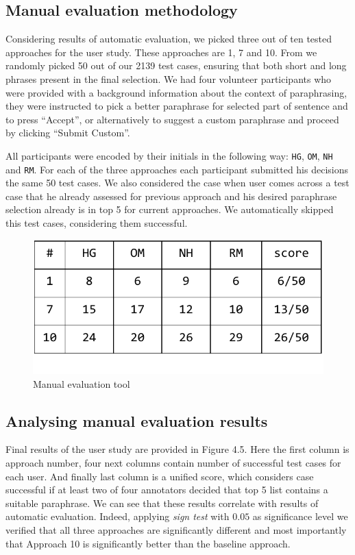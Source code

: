 \subsection{Manual evaluation methodology}

Considering results of automatic evaluation, we picked three out of ten tested approaches for the user study. These approaches are 1, 7 and 10. From we randomly picked 50 out of our 2139 test cases, ensuring that both short and long phrases present in the final selection. We had four volunteer participants who were provided with a background information about the context of paraphrasing, they were instructed to pick a better paraphrase for selected part of sentence and to press ``Accept'', or alternatively to suggest a custom paraphrase and proceed by clicking ``Submit Custom''. 

All participants were encoded by their initials in the following way: \texttt{HG}, \texttt{OM}, \texttt{NH} and \texttt{RM}. For each of the three approaches each participant submitted his decisions the same 50 test cases. We also considered the case when user comes across a test case that he already assessed for previous approach and his desired paraphrase selection already is in top 5 for current approaches. We automatically skipped this test cases, considering them successful. 

\begin{figure}
 \centering 
 \includegraphics[scale=0.8]{g/man-eval-result.pdf}
 \caption{Manual evaluation tool}
\end{figure}

\subsection{Analysing manual evaluation results}

Final results of the user study are provided in Figure 4.5. Here the first column is approach number, four next columns contain number of successful test cases for each user. And finally last column is a unified score, which considers case successful if at least two of four annotators decided that top 5 list contains a suitable paraphrase. We can see that these results correlate with results of automatic evaluation. Indeed, applying \emph{sign test} with $0.05$ as significance level we verified that all three approaches are significantly different and most importantly that Approach 10 is significantly better than the baseline approach.